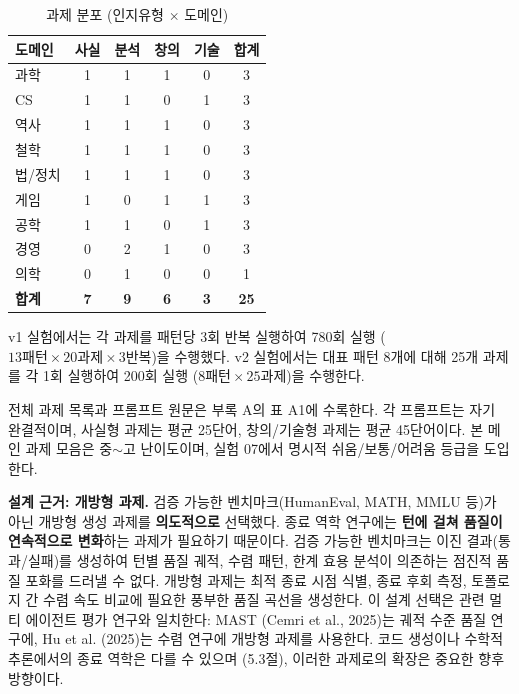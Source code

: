 \documentclass[a4paper,11pt]{article}
\begin{document}
\begin{table}[t]
\centering
\caption{과제 분포 (인지유형 $\times$ 도메인)}
\label{tab:task-distribution}
\begin{tabular}{lccccc}
\toprule
\textbf{도메인} & \textbf{사실} & \textbf{분석} & \textbf{창의} & \textbf{기술} & \textbf{합계} \\
\midrule
과학 & 1 & 1 & 1 & 0 & 3 \\
CS & 1 & 1 & 0 & 1 & 3 \\
역사 & 1 & 1 & 1 & 0 & 3 \\
철학 & 1 & 1 & 1 & 0 & 3 \\
법/정치 & 1 & 1 & 1 & 0 & 3 \\
게임 & 1 & 0 & 1 & 1 & 3 \\
공학 & 1 & 1 & 0 & 1 & 3 \\
경영 & 0 & 2 & 1 & 0 & 3 \\
의학 & 0 & 1 & 0 & 0 & 1 \\
\midrule
\textbf{합계} & \textbf{7} & \textbf{9} & \textbf{6} & \textbf{3} & \textbf{25} \\
\bottomrule
\end{tabular}
\end{table}

v1 실험에서는 각 과제를 패턴당 3회 반복 실행하여 780회 실행 ($13\text{패턴} \times 20\text{과제} \times 3\text{반복}$)을 수행했다. v2 실험에서는 대표 패턴 8개에 대해 25개 과제를 각 1회 실행하여 200회 실행 ($8\text{패턴} \times 25\text{과제}$)을 수행한다.

전체 과제 목록과 프롬프트 원문은 부록 A의 표 A1에 수록한다. 각 프롬프트는 자기 완결적이며, 사실형 과제는 평균 25단어, 창의/기술형 과제는 평균 45단어이다. 본 메인 과제 모음은 중$\sim$고 난이도이며, 실험 07에서 명시적 쉬움/보통/어려움 등급을 도입한다.

\textbf{설계 근거: 개방형 과제.} 검증 가능한 벤치마크(HumanEval, MATH, MMLU 등)가 아닌 개방형 생성 과제를 \textbf{의도적으로} 선택했다. 종료 역학 연구에는 \textbf{턴에 걸쳐 품질이 연속적으로 변화}하는 과제가 필요하기 때문이다. 검증 가능한 벤치마크는 이진 결과(통과/실패)를 생성하여 턴별 품질 궤적, 수렴 패턴, 한계 효용 분석이 의존하는 점진적 품질 포화를 드러낼 수 없다. 개방형 과제는 최적 종료 시점 식별, 종료 후회 측정, 토폴로지 간 수렴 속도 비교에 필요한 풍부한 품질 곡선을 생성한다. 이 설계 선택은 관련 멀티 에이전트 평가 연구와 일치한다: MAST (Cemri et al., 2025)는 궤적 수준 품질 연구에, Hu et al. (2025)는 수렴 연구에 개방형 과제를 사용한다. 코드 생성이나 수학적 추론에서의 종료 역학은 다를 수 있으며 (5.3절), 이러한 과제로의 확장은 중요한 향후 방향이다.
\end{document}
